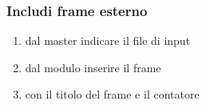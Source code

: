 \begin{frame}
    \frametitle{Includi frame esterno}
    \addtocounter{nframe}{1}

    \begin{enumerate}[<+->]
        \item dal master indicare il file di input
        \item dal modulo inserire il frame
        \item con il titolo del frame e il contatore
    \end{enumerate}
\end{frame}